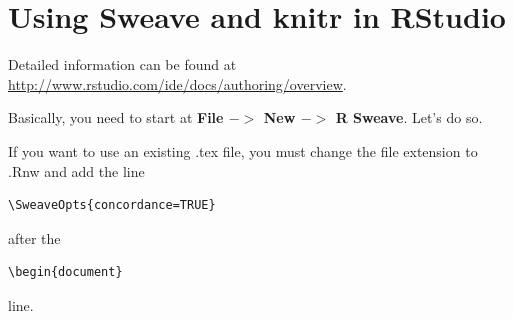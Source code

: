 \documentclass[12pt]{article}
\begin{document}
\section{Using Sweave and knitr in RStudio}

Detailed information can be found at
\url{http://www.rstudio.com/ide/docs/authoring/overview}.

Basically, you need to start at \textbf{File $->$ New $->$ R Sweave}.
Let's do so.


If you want to use an existing .tex file, you must change the file
extension to .Rnw and add the line
\begin{verbatim}
\SweaveOpts{concordance=TRUE}
\end{verbatim}
after the 
\begin{verbatim}
\begin{document}
\end{verbatim}
line.
 
\end{document}
